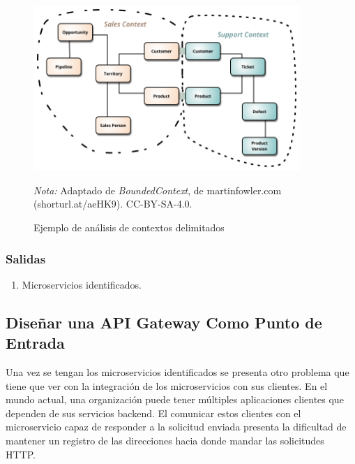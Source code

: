 \vspace{1em}
\begin{figure}[H]
  \caption{Ejemplo de análisis de contextos delimitados}
  \begin{center}
    \includegraphics[width=0.90\textwidth]{src/assets/metodologia/bounded_context}
    \label{fig:bounded_context_example}
  \end{center}
  \textit{Nota:} Adaptado de \textit{BoundedContext}, de \cite{bounded} martinfowler.com (shorturl.at/aeHK9). CC-BY-SA-4.0.
\end{figure}

\subsubsection*{Salidas}
\begin{enumerate}
  \item Microservicios identificados.
\end{enumerate}


\subsection{Diseñar una API Gateway Como Punto de Entrada}
Una vez se tengan los microservicios identificados se presenta otro problema que tiene que ver con
la integración de los microservicios con sus clientes.
En el mundo actual, una organización puede tener múltiples aplicaciones clientes que dependen
de sus servicios backend. 
El comunicar estos clientes con el microservicio capaz de responder a la solicitud enviada
presenta la dificultad de mantener un registro de las direcciones hacia donde mandar las
solicitudes HTTP.

